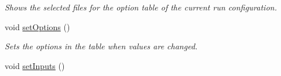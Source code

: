 \begin{DoxyCompactItemize}
\begin{DoxyCompactList}\small\item\em Shows the selected files for the option table of the current run configuration. \end{DoxyCompactList}\item 
\hypertarget{classedu_1_1udel_1_1cis_1_1vsl_1_1civl_1_1gui_1_1common_1_1GUI__revamp_ab0d1d5a4f61e613e90956b7862782f35}{}void \hyperlink{classedu_1_1udel_1_1cis_1_1vsl_1_1civl_1_1gui_1_1common_1_1GUI__revamp_ab0d1d5a4f61e613e90956b7862782f35}{set\+Options} ()\label{classedu_1_1udel_1_1cis_1_1vsl_1_1civl_1_1gui_1_1common_1_1GUI__revamp_ab0d1d5a4f61e613e90956b7862782f35}

\begin{DoxyCompactList}\small\item\em Sets the options in the table when values are changed. \end{DoxyCompactList}\item 
\hypertarget{classedu_1_1udel_1_1cis_1_1vsl_1_1civl_1_1gui_1_1common_1_1GUI__revamp_ae652123359824dddcc5e930124df3c52}{}void \hyperlink{classedu_1_1udel_1_1cis_1_1vsl_1_1civl_1_1gui_1_1common_1_1GUI__revamp_ae652123359824dddcc5e930124df3c52}{set\+Inputs} ()\label{classedu_1_1udel_1_1cis_1_1vsl_1_1civl_1_1gui_1_1common_1_1GUI__revamp_ae652123359824dddcc5e930124df3c52}


\end{DoxyCompactItemize}
